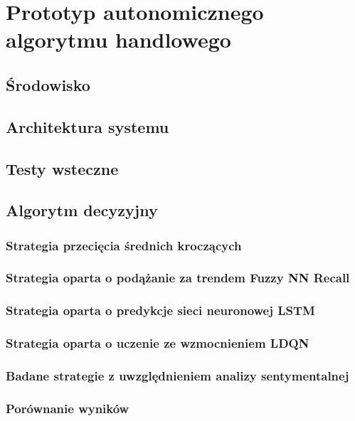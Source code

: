 \chapter{Prototyp autonomicznego algorytmu handlowego}
\section{Środowisko}
\section{Architektura systemu}
\section{Testy wsteczne}
\section{Algorytm decyzyjny}
\subsection*{Strategia przecięcia średnich kroczących}
\subsection*{Strategia oparta o podążanie za trendem Fuzzy NN Recall}
\subsection*{Strategia oparta o predykcje sieci neuronowej LSTM}
\subsection*{Strategia oparta o uczenie ze wzmocnieniem LDQN}
\subsection*{Badane strategie z uwzględnieniem analizy sentymentalnej}
\subsection*{Porównanie wyników}

